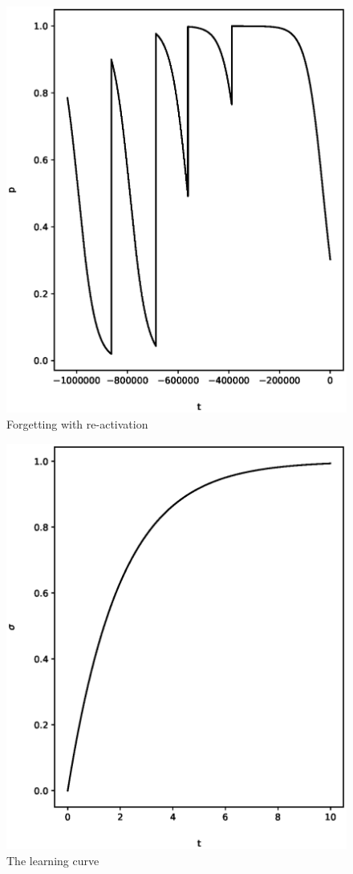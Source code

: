 \begin{figure}[p!]
 \label{fig:memory}
 \includegraphics{fig/memory.eps} 
 \caption{Forgetting with re-activation}
\end{figure}

\begin{figure}[p!]
 \label{fig:spacing}
 \includegraphics{fig/spacing.eps} 
 \caption{The learning curve}
\end{figure}

